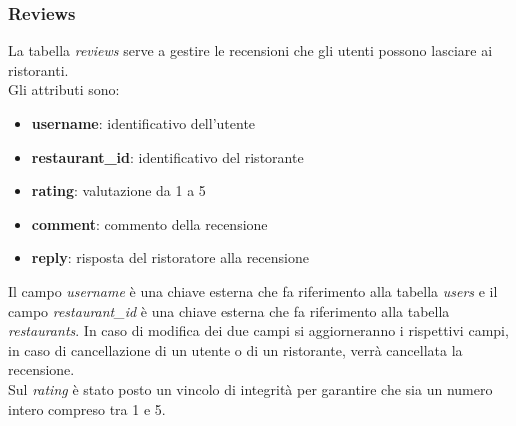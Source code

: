 \subsubsection{Reviews}
\label{sec:reviews}
La tabella \textit{reviews} serve a gestire le recensioni
che gli utenti possono lasciare ai ristoranti.\\
Gli attributi sono:
\begin{itemize}
    \item \textbf{username}: identificativo dell'utente
    \item \textbf{restaurant\_id}: identificativo del ristorante
    \item \textbf{rating}: valutazione da 1 a 5
    \item \textbf{comment}: commento della recensione
    \item \textbf{reply}: risposta del ristoratore alla recensione
\end{itemize}
Il campo \textit{username} è una chiave esterna che fa riferimento
alla tabella \textit{users} e il campo \textit{restaurant\_id} 
è una chiave esterna che fa riferimento
alla tabella \textit{restaurants}. In caso di modifica dei due campi
si aggiorneranno i rispettivi campi, in caso di cancellazione
di un utente o di un ristorante, verrà cancellata la recensione.\\
Sul \textit{rating} è stato posto un vincolo di integrità
per garantire che sia un numero intero compreso tra 1 e 5.

